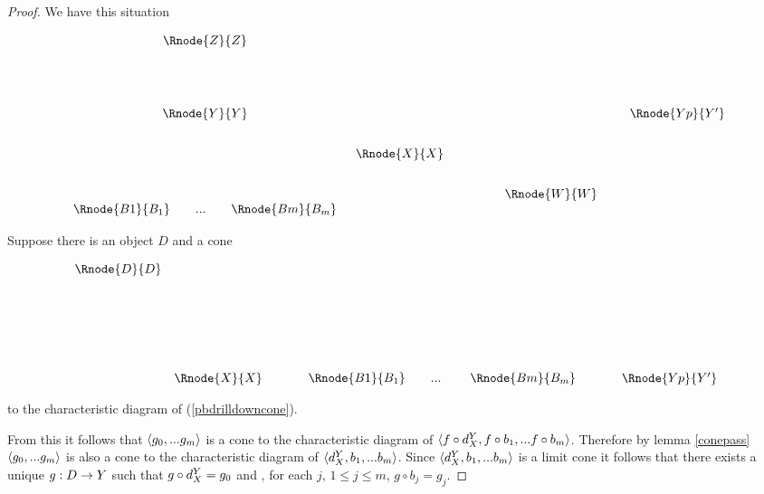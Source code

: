 \documentclass[10pt,a4paper]{scrartcl}
\begin{document}
\begin{proof}
We have this situation

\begin{center}
\begin{displaymath}
\begin{array}{c c p{1.0cm} c p{0.2cm}c}
  \Rnode{Z}{Z} & &                       & &  &                  \\ [1.6cm]
  \Rnode{Y}{Y} & &                       & &  & \Rnode{Yp}{Y'}   \\ [0.7cm]
	             &  \Rnode{X}{X} & &  &                  \\ [0.7cm]
	             & &                       & \Rnode{W}{W} & &      \\
	 \begin{array}{cp{0cm}c   p{0cm}     c  }					
   \Rnode{B1}{B_1}&   & ... & & \Rnode{Bm}{B_m}
	 \end{array} 
	 & & & &                                                
\end{array} 
\end{displaymath}
\end{center}


Suppose there is an object $D$ and a cone 
\begin{center}
\begin{displaymath}
\begin{array}{c c p{0.4cm} c p{0.4cm} c }
\Rnode{D}{D}&  && &&      \\ [2.6cm]
      & \Rnode{X}{X}&& \begin{array}{cp{0cm}c   p{0.1cm}     c  }					
                             \Rnode{B1}{B_1}&   & ... & & \Rnode{Bm}{B_m}
	                      \end{array} 
	 && \Rnode{Yp}{Y'}                                              
\end{array} 
\end{displaymath}
\end{center}
to the characteristic diagram of  (\ref{pbdrilldowncone}).

From this it follows that $\langle g_0,...g_m\rangle$ is a cone to the characteristic diagram of
$\langle f \circ d^{Y}_{X}, f \circ b_1, ... f \circ b_m\rangle$.
Therefore by lemma \ref{conepass} $\langle g_0,...g_m\rangle$ is also a cone to the characteristic
diagram of $\langle d^{Y}_{X}, b_1, ... b_m\rangle$. Since $\langle d^{Y}_{X}, b_1, ... b_m\rangle$ is a limit cone it follows that there exists a unique $g:D \rightarrow Y$ such that $g \circ d^{Y}_{X}=g_0$ and , for each $j$, $1 \leq j \leq m$, $g \circ b_j=g_j$.


\end{proof}
\end{document}
